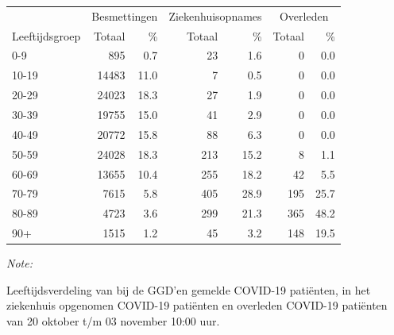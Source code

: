 \documentclass[
  english,
  man,floatsintext]{apa6}
\begin{document}
\begin{table}[H]
\centering\begingroup\fontsize{11}{13}\selectfont

\begin{threeparttable}
\begin{tabular}{lrrrrrr}
\toprule
\multicolumn{1}{c}{ } & \multicolumn{2}{c}{Besmettingen} & \multicolumn{2}{c}{Ziekenhuisopnames} & \multicolumn{2}{c}{Overleden} \\
\cmidrule(l{3pt}r{3pt}){2-3} \cmidrule(l{3pt}r{3pt}){4-5} \cmidrule(l{3pt}r{3pt}){6-7}
Leeftijdsgroep & Totaal & \% & Totaal & \% & Totaal & \%\\
\midrule
0-9 & 895 & 0.7 & 23 & 1.6 & 0 & 0.0\\
10-19 & 14483 & 11.0 & 7 & 0.5 & 0 & 0.0\\
20-29 & 24023 & 18.3 & 27 & 1.9 & 0 & 0.0\\
30-39 & 19755 & 15.0 & 41 & 2.9 & 0 & 0.0\\
40-49 & 20772 & 15.8 & 88 & 6.3 & 0 & 0.0\\
50-59 & 24028 & 18.3 & 213 & 15.2 & 8 & 1.1\\
60-69 & 13655 & 10.4 & 255 & 18.2 & 42 & 5.5\\
70-79 & 7615 & 5.8 & 405 & 28.9 & 195 & 25.7\\
80-89 & 4723 & 3.6 & 299 & 21.3 & 365 & 48.2\\
90+ & 1515 & 1.2 & 45 & 3.2 & 148 & 19.5\\
\bottomrule
\end{tabular}
\begin{tablenotes}
\item \textit{Note: } 
\item Leeftijdsverdeling van bij de GGD’en gemelde COVID-19 patiënten, in het ziekenhuis opgenomen COVID-19 patiënten en overleden COVID-19 patiënten van 20 oktober t/m 03 november 10:00 uur.
\end{tablenotes}
\end{threeparttable}
\endgroup{}
\end{table}
\end{document}
